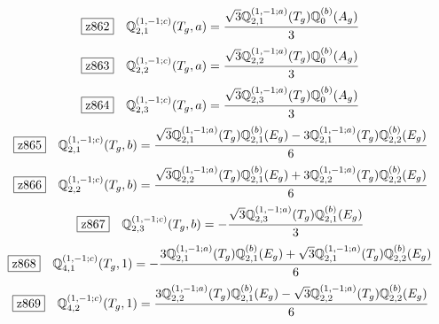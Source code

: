 \documentclass[fleqn,10pt,landscape]{jsarticle}
\begin{document}
\begin{dmath*}
\hspace*{3mm}\fbox{z862}\quad \mathbb{Q}_{2,1}^{(1,-1;c)}(T_{g},a)=\frac{\sqrt{3} \mathbb{Q}_{2,1}^{(1,-1;a)}(T_{g}) \mathbb{Q}_{0}^{(b)}(A_{g})}{3}
\end{dmath*}
\begin{dmath*}
\hspace*{3mm}\fbox{z863}\quad \mathbb{Q}_{2,2}^{(1,-1;c)}(T_{g},a)=\frac{\sqrt{3} \mathbb{Q}_{2,2}^{(1,-1;a)}(T_{g}) \mathbb{Q}_{0}^{(b)}(A_{g})}{3}
\end{dmath*}
\begin{dmath*}
\hspace*{3mm}\fbox{z864}\quad \mathbb{Q}_{2,3}^{(1,-1;c)}(T_{g},a)=\frac{\sqrt{3} \mathbb{Q}_{2,3}^{(1,-1;a)}(T_{g}) \mathbb{Q}_{0}^{(b)}(A_{g})}{3}
\end{dmath*}
\begin{dmath*}
\hspace*{3mm}\fbox{z865}\quad \mathbb{Q}_{2,1}^{(1,-1;c)}(T_{g},b)=\frac{\sqrt{3} \mathbb{Q}_{2,1}^{(1,-1;a)}(T_{g}) \mathbb{Q}_{2,1}^{(b)}(E_{g}) - 3 \mathbb{Q}_{2,1}^{(1,-1;a)}(T_{g}) \mathbb{Q}_{2,2}^{(b)}(E_{g})}{6}
\end{dmath*}
\begin{dmath*}
\hspace*{3mm}\fbox{z866}\quad \mathbb{Q}_{2,2}^{(1,-1;c)}(T_{g},b)=\frac{\sqrt{3} \mathbb{Q}_{2,2}^{(1,-1;a)}(T_{g}) \mathbb{Q}_{2,1}^{(b)}(E_{g}) + 3 \mathbb{Q}_{2,2}^{(1,-1;a)}(T_{g}) \mathbb{Q}_{2,2}^{(b)}(E_{g})}{6}
\end{dmath*}
\begin{dmath*}
\hspace*{3mm}\fbox{z867}\quad \mathbb{Q}_{2,3}^{(1,-1;c)}(T_{g},b)=- \frac{\sqrt{3} \mathbb{Q}_{2,3}^{(1,-1;a)}(T_{g}) \mathbb{Q}_{2,1}^{(b)}(E_{g})}{3}
\end{dmath*}
\begin{dmath*}
\hspace*{3mm}\fbox{z868}\quad \mathbb{Q}_{4,1}^{(1,-1;c)}(T_{g},1)=- \frac{3 \mathbb{Q}_{2,1}^{(1,-1;a)}(T_{g}) \mathbb{Q}_{2,1}^{(b)}(E_{g}) + \sqrt{3} \mathbb{Q}_{2,1}^{(1,-1;a)}(T_{g}) \mathbb{Q}_{2,2}^{(b)}(E_{g})}{6}
\end{dmath*}
\begin{dmath*}
\hspace*{3mm}\fbox{z869}\quad \mathbb{Q}_{4,2}^{(1,-1;c)}(T_{g},1)=\frac{3 \mathbb{Q}_{2,2}^{(1,-1;a)}(T_{g}) \mathbb{Q}_{2,1}^{(b)}(E_{g}) - \sqrt{3} \mathbb{Q}_{2,2}^{(1,-1;a)}(T_{g}) \mathbb{Q}_{2,2}^{(b)}(E_{g})}{6}
\end{dmath*}
\end{document}
